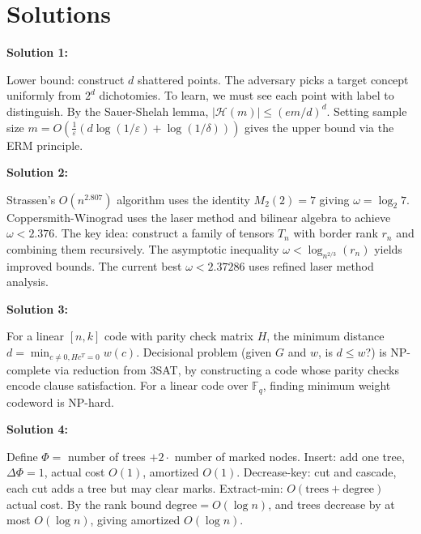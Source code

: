 \documentclass[12pt,a4paper]{exam}
\begin{document}
\newpage
\section*{Solutions}

\textbf{Solution 1:}

Lower bound: construct $d$ shattered points. The adversary picks a target concept uniformly from $2^d$ dichotomies. To learn, we must see each point with label to distinguish. By the Sauer-Shelah lemma, $|\mathcal{H}(m)| \leq (em/d)^d$. Setting sample size $m = O(\frac{1}{\varepsilon}(d \log(1/\varepsilon) + \log(1/\delta)))$ gives the upper bound via the ERM principle.

\vspace{0.5cm}

\textbf{Solution 2:}

Strassen's $O(n^{2.807})$ algorithm uses the identity $M_2(2) = 7$ giving $\omega = \log_2 7$. Coppersmith-Winograd uses the laser method and bilinear algebra to achieve $\omega < 2.376$. The key idea: construct a family of tensors $T_n$ with border rank $r_n$ and combining them recursively. The asymptotic inequality $\omega < \log_{n^{2/3}}(r_n)$ yields improved bounds. The current best $\omega < 2.37286$ uses refined laser method analysis.

\vspace{0.5cm}

\textbf{Solution 3:}

For a linear $[n,k]$ code with parity check matrix $H$, the minimum distance $d = \min_{c \neq 0, Hc^T=0} w(c)$. Decisional problem (given $G$ and $w$, is $d \leq w$?) is NP-complete via reduction from 3SAT, by constructing a code whose parity checks encode clause satisfaction. For a linear code over $\mathbb{F}_q$, finding minimum weight codeword is NP-hard.

\vspace{0.5cm}

\textbf{Solution 4:}

Define $\Phi =$ number of trees $+ 2 \cdot$ number of marked nodes. Insert: add one tree, $\Delta\Phi = 1$, actual cost $O(1)$, amortized $O(1)$. Decrease-key: cut and cascade, each cut adds a tree but may clear marks. Extract-min: $O(\text{trees} + \text{degree})$ actual cost. By the rank bound $\text{degree} = O(\log n)$, and trees decrease by at most $O(\log n)$, giving amortized $O(\log n)$.

\vspace{0.5cm}
\end{document}
